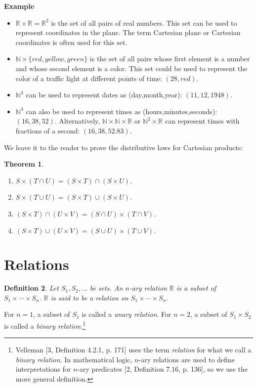 \documentclass[12pt,a4paper]{article}
\newtheorem{theorem}{Theorem}
\newtheorem{definition}[theorem]{Definition}
\newenvironment{example}{\textbf{Example}}{}
\begin{document}
\begin{example}\mbox{}
\begin{itemize}
\item $\mathbb{R} \times \mathbb{R} = \mathbb{R}^{2}$ is the set of
all pairs of real numbers. This set can be used to represent coordinates in the plane. The term Cartesian plane or Cartesian coordinates is often used for this set.
\item $\mathbb{N} \times \{\mathit{red}, \mathit{yellow},
\mathit{green}\}$ is the set of all pairs whose first element is a
number and whose second element is a color. This set could be used to represent the
color of a traffic light at different points of time: $(28,\mathit{red})$.
\item $\mathbb{N}^3$ can be used to represent dates as (day,month,year): $(11,12,1948)$.
\item $\mathbb{N}^3$ can also be used to represent times as (hours,minutes,seconds): $(16,38,52)$. Alternatively, $\mathbb{N}\times \mathbb{N} \times \mathbb{R}$ or $\mathbb{N}^2 \times \mathbb{R}$ can represent times with fractions of a second: $(16,38,52.83)$.
\end{itemize}
\end{example}

We leave it to the reader to prove the distributive laws for Cartesian products:
\begin{theorem}\mbox{}
\begin{enumerate}
\item $S\times (T \cap U) = (S \times T) \cap (S\times U)$.
\item $S\times (T \cup U) = (S \times T) \cup (S\times U)$.
\item $(S \times T) \cap (U\times V) = (S \cap U) \times (T\cap V)$.
\item $(S \times T) \cup (U\times V) = (S \cup U) \times (T\cup V)$.
\end{enumerate}
\end{theorem}


\section{Relations}\label{s.relation}

\begin{definition}
Let $S_1, S_2, \ldots$ be sets. An \emph{$n$-ary relation} $\mathbb{R}$ is a subset of $S_{1}\times \cdots \times S_{n}$. $\mathbb{R}$ is said to be a relation \emph{on} $S_{1}\times \cdots \times S_{n}$. 
\end{definition}
\vspace{-2ex}
For $n=1$, a subset of $S_1$ is called a \emph{unary relation}. For $n=2$, a subset of $S_1\times S_2$ is called a \emph{binary relation}.\footnote{Velleman [3, Definition 4.2.1, p. 171] uses the term \emph{relation} for what we call a \emph{binary relation}. In mathematical logic, $n$-ary relations are used to define interpretations for $n$-ary predicates [2, Definition 7.16, p. 136], so we use the more general definition.}
\end{document}
